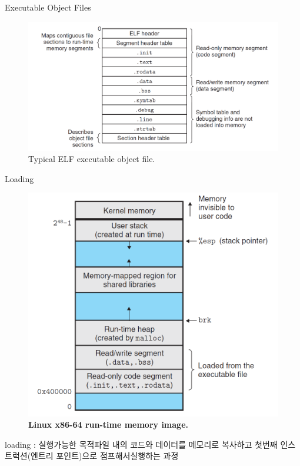 \documentclass[10pt]{beamer}
\begin{document}
\begin{frame}{Executable Object Files}
    \begin{figure}[h!]
        \centering
        \includegraphics[scale=0.24]{pic3.PNG}
        \caption{Typical ELF executable object file.}
    \end{figure}
\end{frame}    

\begin{frame}{Loading}    
    \begin{figure}[h!]
        \centering
        \includegraphics[scale=0.3]{pic4.PNG}
        \caption{\textbf{Linux x86-64 run-time memory image.}}
    \end{figure}
    loading : 실행가능한 목적파일 내의 코드와 데이터를 메모리로 복사하고 첫번째 인스트럭션(엔트리 포인트)으로 점프해서실행하는 과정
\end{frame}    
\end{document}

